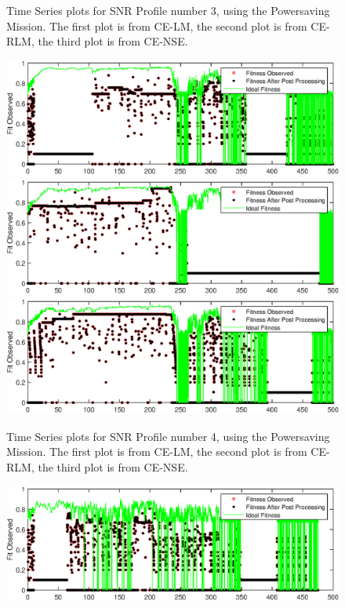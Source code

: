 \begin{appendices}
\begin{figure}[ht!]
\caption{Time Series plots for SNR Profile number 3, using the Powersaving Mission. The first plot is from CE-LM, the second plot is from CE-RLM, the third plot is from CE-NSE.}
\end{figure}
\begin{figure}[ht!]
\includegraphics{figures/c_sim_timeSeries/Fitness_timeSeries_LM_4.eps}
\includegraphics{figures/c_sim_timeSeries/Fitness_timeSeries_RLM_4.eps}
\includegraphics{figures/c_sim_timeSeries/Fitness_timeSeries_NSE_4.eps}
\caption{Time Series plots for SNR Profile number 4, using the Powersaving Mission. The first plot is from CE-LM, the second plot is from CE-RLM, the third plot is from CE-NSE.}
\end{figure}
\begin{figure}[ht!]
\includegraphics{figures/c_sim_timeSeries/Fitness_timeSeries_LM_5.eps}

\end{figure}
\end{appendices}

